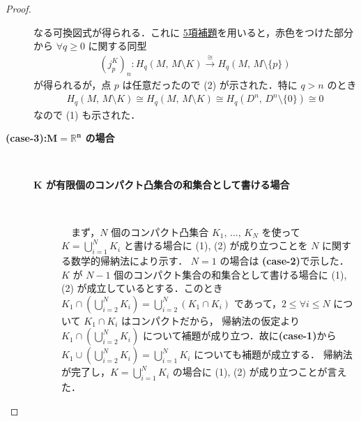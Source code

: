 \documentclass[algtopo_main]{subfiles}
\begin{document}
\begin{proof}
\begin{description}
\begin{center}
        \end{center}
        なる可換図式が得られる．これに
        \hyperref[thm:five-lemma]{5項補題}を用いると，赤色をつけた部分から $\forall q \ge 0$ に関する同型 
        \begin{align}
            \label{eq:fc-1-case2-1}
            (j_p^K)_n \colon H_q (M,\, M \setminus K) \xrightarrow{\cong} H_q(M,\, M \setminus \{p\})
        \end{align}
        が得られるが，点 $p$ は任意だったので (2) が示された．特に $q > n$ のとき
        \begin{align}
            H_q(M,\, M \setminus K) \cong H_q (M,\, M \setminus K) \cong H_q (D^n,\, D^n \setminus \{0\}) \cong 0
        \end{align}
        なので (1) も示された．

        \item[\textbf{(case-3):$\bm{M = \mathbb{R}^n}$ の場合}]　
        \begin{description}
            \item[\textbf{$\bm{K}$ が有限個のコンパクト凸集合の和集合として書ける場合}]　
            
            　まず，$N$ 個のコンパクト凸集合 $K_1,\, \dots ,\, K_N$ を使って $K = \bigcup_{i=1}^N K_i$ と書ける場合に (1), (2) が成り立つことを $N$ に関する数学的帰納法により示す．
            $N = 1$ の場合は \textbf{\textsf{(case-2)}}で示した．
            $K$ が $N-1$ 個のコンパクト集合の和集合として書ける場合に (1), (2) が成立しているとする．このとき $K_1 \cap \left( \bigcup_{i=2}^N K_i \right) = \bigcup_{i=2}^N (K_1 \cap K_i)$ であって，$2 \le \forall i \le N$ について $K_1 \cap K_i$ はコンパクトだから，
            帰納法の仮定より $K_1 \cap \left( \bigcup_{i=2}^N K_i \right) $ について補題が成り立つ．故に\textbf{\textsf{(case-1)}}から $K_1 \cup \left( \bigcup_{i=2}^N K_i \right) = \bigcup_{i=1}^N K_i$ についても補題が成立する．
            帰納法が完了し，$K = \bigcup_{i=1}^N K_i$ の場合に (1), (2) が成り立つことが言えた．


\end{description}
\end{description}
\end{proof}
\end{document}

